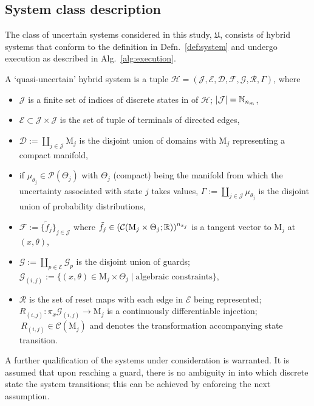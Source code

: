   \subsection{System class description}
  The class of uncertain systems considered in this study, $\mathfrak{U}$, consists of hybrid systems that conform to the definition in Defn.~\ref{def:system} and undergo execution as described in Alg.~\ref{alg:execution}.
\begin{defn}\label{def:system}
  A `quasi-uncertain' hybrid system is a tuple \mbox{$\mathcal H=(\mathcal J,\mathcal E,\mathcal D,\mathcal F,\mathcal G,\mathcal R,\Gamma)$}, where
  \begin{itemize}
    \item $\mathcal J$ is a finite set of indices of discrete states in of $\mathcal H$; $|\mathcal J|=\mathbb{N}_{n_m}$,
    \item $\mathcal E\subset \mathcal J\times \mathcal J$ is the set of tuple of terminals of directed edges,
    \item $\mathcal D:=\coprod_{j\in\mathcal J} \mathrm{M}_j$ is the disjoint union of domains with  $\mathrm{M}_j$ representing a compact manifold,
    \item if $\mu_{\theta_j}\in \mathcal P(\Theta_j)$ with  $\Theta_j$ (compact) being the manifold from which the uncertainty associated with state $j$ takes values, $\Gamma:=\coprod_{j\in \mathcal J} \mu_{\theta_j}$ is the disjoint union of probability distributions,
    \item $\mathcal F:=\{\tilde f_j\}_{j\in \mathcal J}$ where \mbox{$\tilde f_j\in (\mathcal C(\mathrm{M}_j\times \Theta_j;\mathbb{R}))^{n_{x_j}}$} is a tangent vector to $\mathrm{M}_j$ at $(x,\theta)$,
    \item $\mathcal G:=\coprod_{p\in \mathcal E}\mathcal G_p$ is the disjoint union of guards; \mbox{$\mathcal G_{(i,j)}:=\{(x,\theta)\in \mathrm{M}_j\times \Theta_j\mid \text{algebraic constraints}\}$},
    \item $\mathcal R$ is the set of reset maps with each edge in $\mathcal E$ being represented; $R_{(i,j)}\colon \pi_{x}\mathcal G_{(i,j)}\rightarrow \mathrm{M}_j$ is a continuously differentiable injection; $\,R_{(i,j)}\in \mathcal C(\mathrm{M}_j)$ and denotes the transformation accompanying state transition.
  \end{itemize}
\end{defn}
A further qualification of the systems under consideration is warranted. It is assumed that upon reaching a guard, there is no ambiguity in into which discrete state the system transitions; this can be achieved by enforcing the next assumption.
